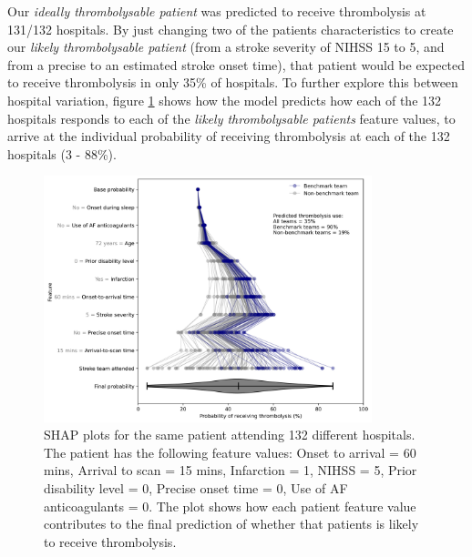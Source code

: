 Our \emph{ideally thrombolysable patient} was predicted to receive thrombolysis at 131/132 hospitals. By just changing two of the patients characteristics to create our \emph{likely thrombolysable patient} (from a stroke severity of NIHSS 15 to 5, and from a precise to an estimated stroke onset time), that patient would be expected to receive thrombolysis in only 35\% of hospitals. To further explore this between hospital variation, figure \ref{fig:results_artifical_shap_waterfall_with_violin} shows how the model predicts how each of the 132 hospitals responds to each of the \emph{likely thrombolysable patients} feature values, to arrive at the individual probability of receiving thrombolysis at each of the 132 hospitals (3 - 88\%).

\begin{figure}[!h]
\centering
\includegraphics[width=0.85\textwidth]{./images/21_shap_waterfall_with_violin_contentious}
\caption{SHAP plots for the same patient attending 132 different hospitals. The patient has the following feature values: Onset to arrival = 60 mins, Arrival to scan = 15 mins, Infarction = 1, NIHSS = 5, Prior disability level = 0, Precise onset time = 0, Use of AF anticoagulants = 0. The plot shows how each patient feature value contributes to the final prediction of whether that patients is likely to receive thrombolysis.}
\label{fig:results_artifical_shap_waterfall_with_violin}
\end{figure}









